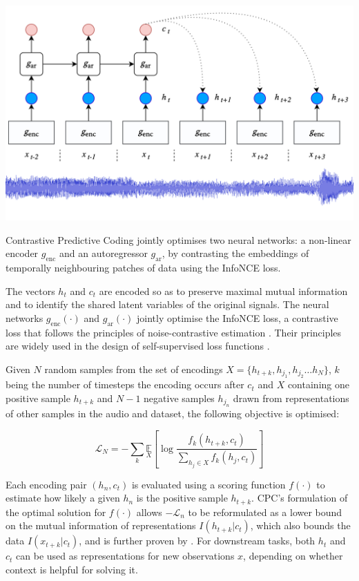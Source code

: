 \begin{marginfigure}[{-1cm}]
    \includegraphics[width=\textwidth]{figs/cpc_model.png}
    \caption{Contrastive Predictive Coding jointly optimises two neural networks: a non-linear encoder $g_{\mathrm{enc}}$ and an autoregressor $g_{\mathrm{ar}}$, by contrasting the embeddings of temporally neighbouring patches of data using the InfoNCE loss.}
    \label{fig:cpc_model}
\end{marginfigure}

The vectors $h_t$ and $c_t$ are encoded so as to preserve maximal mutual information and to identify the shared latent variables of the original signals. The neural networks $g_{\mathrm{enc}}(\cdot)$ and $g_{\mathrm{ar}}(\cdot)$ jointly optimise the InfoNCE loss, a contrastive loss that follows the principles of noise-contrastive estimation \cite{gutmann_noise-contrastive_nodate}. Their principles are widely used in the design of self-supervised loss functions \cite{oord_representation_2019, sohn2020fixmatch, chen_simple_2020}.

Given $N$ random samples from the set of encodings $X = \{h_{t+k}, h_{j_1}, h_{j_2} \hdots h_N\}$, $k$ being the number of timesteps the encoding occurs after $c_t$ and $X$ containing one positive sample $h_{t+k}$ and $N-1$ negative samples $h_{j_{n}}$ drawn from representations of other samples in the audio and dataset, the following objective is optimised:

\begin{equation}
    \mathcal{L}_{N}=-\sum_{k} \underset{X}{\mathbb{E}}\left[\log \frac{f_{k}\left(h_{t+k}, c_{t}\right)}{\sum_{h_{j} \in X} f_{k}\left(h_{j}, c_{t}\right)}\right]
\end{equation}

Each encoding pair $(h_n, c_t)$ is evaluated using a scoring function $f(\cdot)$ to estimate how likely a given $h_n$ is the positive sample $h_{t+k}$.
CPC's formulation of the optimal solution for $f(\cdot)$ allows $-\mathcal{L}_n$ to be reformulated as a lower bound on the mutual information of representations $I(h_{t+k} | c_t)$, which also bounds the data $I(x_{t+k} | c_t)$, and is further proven by \cite{poole_variational_2019}.
For downstream tasks, both $h_t$ and $c_t$ can be used as representations for new observations $x$, depending on whether context is helpful for solving it.

